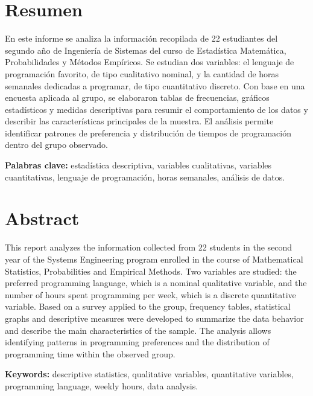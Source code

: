 \documentclass[12pt,letterpaper]{article}
\begin{document}


\section*{Resumen}
En este informe se analiza la información recopilada de 22 estudiantes del segundo año de Ingeniería de Sistemas del curso de Estadística Matemática, Probabilidades y Métodos Empíricos. Se estudian dos variables: el lenguaje de programación favorito, de tipo cualitativo nominal, y la cantidad de horas semanales dedicadas a programar, de tipo cuantitativo discreto. Con base en una encuesta aplicada al grupo, se elaboraron tablas de frecuencias, gráficos estadísticos y medidas descriptivas para resumir el comportamiento de los datos y describir las características principales de la muestra. El análisis permite identificar patrones de preferencia y distribución de tiempos de programación dentro del grupo observado.

\vspace{1em}

\textbf{Palabras clave:} estadística descriptiva, variables cualitativas, variables cuantitativas, lenguaje de programación, horas semanales, análisis de datos.

\newpage
\section*{Abstract}
This report analyzes the information collected from 22 students in the second year of the Systems Engineering program enrolled in the course of Mathematical Statistics, Probabilities and Empirical Methods. Two variables are studied: the preferred programming language, which is a nominal qualitative variable, and the number of hours spent programming per week, which is a discrete quantitative variable. Based on a survey applied to the group, frequency tables, statistical graphs and descriptive measures were developed to summarize the data behavior and describe the main characteristics of the sample. The analysis allows identifying patterns in programming preferences and the distribution of programming time within the observed group.

\vspace{1em}

\textbf{Keywords:} descriptive statistics, qualitative variables, quantitative variables, programming language, weekly hours, data analysis.
\end{document}
